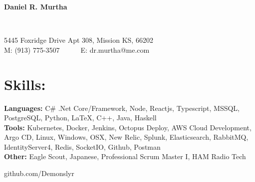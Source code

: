 \documentclass{res}
\begin{document}
\begin{resume}
\begin{changemargin}{-0.4in}{0in}
	\begin{center}
		\begin{Huge}
		\textbf{Daniel R. Murtha}
		\end{Huge}
	\\
		\begin{normalsize}
			5445 Foxridge Drive Apt 308, Mission KS, 66202\\
			M: (913) 775-3507~~~~~~E: dr.murtha@me.com
		\end{normalsize}
	\end{center}
\end{changemargin}\vspace{-15pt}
 \section{Skills:}\vspace{-5pt}
 \begin{minipage}{0.8\linewidth}
 	\begin{small}
 		\begin{flushleft}
 			{\bf Languages: }C\# .Net Core/Framework, Node, Reactjs, Typescript, MSSQL, PostgreSQL, Python, LaTeX, C++, Java, Haskell\\
			{\bf Tools: }Kubernetes, Docker, Jenkins, Octopus Deploy, AWS Cloud Development, Argo CD, Linux, Windows, OSX, New Relic, Splunk, Elasticsearch, RabbitMQ, IdentityServer4, Redis, SocketIO, Github, Postman \\
			{\bf Other: } Eagle Scout, Japanese, Professional Scrum Master I, HAM Radio Tech
 		\end{flushleft}
 	\end{small}   
 \end{minipage}\vspace{-15pt}
 \begin{minipage}{0.2\linewidth}
 	\begin{small}   
		\begin{flushright}
			github.com/Demonslyr\\
		\end{flushright}     
 	\end{small}   
 \end{minipage}\vspace{-10pt}

\end{resume}
\end{document}
